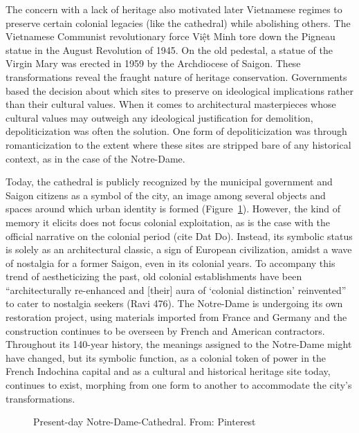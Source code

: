 The concern with a lack of heritage also motivated later Vietnamese regimes to preserve certain colonial legacies (like the cathedral) while abolishing others. The Vietnamese Communist revolutionary force Việt Minh tore down the Pigneau statue in the August Revolution of 1945. On the old pedestal, a statue of the Virgin Mary was erected in 1959 by the Archdiocese of Saigon.  These transformations reveal the fraught nature of heritage conservation. Governments based the decision about which sites to preserve on ideological implications rather than their cultural values. When it comes to architectural masterpieces whose cultural values may outweigh any ideological justification for demolition, depoliticization was often the solution. One form of depoliticization was through romanticization to the extent where these sites are stripped bare of any historical context, as in the case of the Notre-Dame.

Today, the cathedral is publicly recognized by the municipal government and Saigon citizens as a symbol of the city, an image among several objects and spaces around which urban identity is formed (Figure~\ref{cathedral_present}). However, the kind of memory it elicits does not focus colonial exploitation, as is the case with the official narrative on the colonial period (cite Dat Do). Instead, its symbolic status is solely as an architectural classic, a sign of European civilization, amidst a wave of nostalgia for a former Saigon, even in its colonial years. To accompany this trend of aestheticizing the past, old colonial establishments have been “architecturally re-enhanced and [their] aura of ‘colonial distinction’ reinvented” to cater to nostalgia seekers (Ravi 476).  The Notre-Dame is undergoing its own restoration project, using materials imported from France and Germany and the construction continues to be overseen by French and American contractors. Throughout its 140-year history, the meanings assigned to the Notre-Dame might have changed, but its symbolic function, as a colonial token of power in the French Indochina capital and as a cultural and historical heritage site today, continues to exist, morphing from one form to another to accommodate the city’s transformations. \en

\begin{figure}[!ht]
\begin{center}
\vspace{-.2 in}
\caption[Present-day Notre-Dame Cathedral]{Present-day Notre-Dame-Cathedral. From: Pinterest \en}\label{cathedral_present}
\end{center}
\vspace{-.2 in}
\end{figure}


